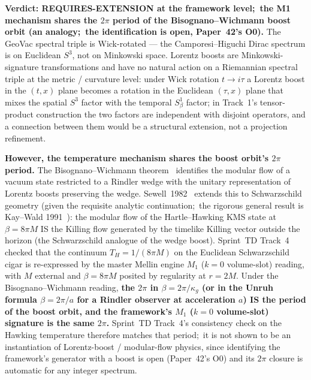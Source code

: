 \documentclass[11pt]{article}
\begin{document}
\begin{enumerate}
\textbf{Verdict: REQUIRES-EXTENSION at the framework level;\ the M1
mechanism shares the $2\pi$ period of the Bisognano--Wichmann boost orbit
(an analogy;\ the identification is open, Paper~42's O0).}  The GeoVac spectral triple is
Wick-rotated --- the Camporesi--Higuchi Dirac spectrum is on
Euclidean $S^3$, not on Minkowski space.  Lorentz boosts are
Minkowski-signature transformations and have no natural action on a
Riemannian spectral triple at the metric / curvature level: under
Wick rotation $t \to i\tau$ a Lorentz boost in the $(t, x)$ plane
becomes a rotation in the Euclidean $(\tau, x)$ plane that mixes
the spatial $S^3$ factor with the temporal $S^1_\beta$ factor; in
Track~1's tensor-product construction the two factors are
independent with disjoint operators, and a connection between them
would be a structural extension, not a projection refinement.

\textbf{However, the temperature mechanism shares the boost orbit's
$2\pi$ period.}  The Bisognano--Wichmann theorem~\cite{bisognano_wichmann1976}
identifies the modular flow of a vacuum state restricted to a
Rindler wedge with the unitary representation of Lorentz boosts
preserving the wedge.  Sewell~1982~\cite{sewell1982} extends this
to Schwarzschild geometry (given the requisite analytic continuation;\
the rigorous general result is Kay--Wald 1991~\cite{kay_wald1991}):
the modular flow of the Hartle--Hawking KMS state at
$\beta = 8\pi M$ IS the Killing flow generated by the timelike Killing
vector outside the horizon (the Schwarzschild analogue of the wedge
boost).  Sprint~TD Track~4 checked that the continuum
$T_H = 1/(8\pi M)$ on the Euclidean Schwarzschild cigar is re-expressed
by the master Mellin engine $M_1$ ($k = 0$ volume-slot) reading, with
$M$ external and $\beta = 8\pi M$ posited by regularity at $r = 2M$.  Under the
Bisognano--Wichmann reading, \textbf{the $2\pi$ in $\beta = 2\pi/\kappa_g$
(or in the Unruh formula $\beta = 2\pi/a$ for a Rindler observer at
acceleration $a$) IS the period of the boost orbit, and the
framework's $M_1$ ($k = 0$ volume-slot) signature is the same $2\pi$.}
Sprint~TD Track~4's consistency check on the Hawking temperature therefore
matches that period;\ it is not shown to be an instantiation of
Lorentz-boost / modular-flow physics, since identifying the framework's
generator with a boost is open (Paper~42's O0) and its $2\pi$ closure is
automatic for any integer spectrum.


\end{enumerate}
\end{document}
